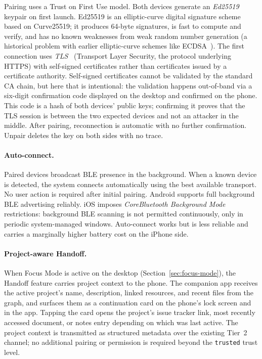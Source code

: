 Pairing uses a Trust on First Use model. Both devices generate an
\emph{Ed25519}~\cite{rfc8032} keypair on first launch. Ed25519 is an elliptic-curve digital signature scheme based on Curve25519;
it produces 64-byte signatures, is fast to compute and verify, and has no
known weaknesses from weak random number generation (a historical problem with
earlier elliptic-curve schemes like ECDSA~\cite{bitcoin:ecdsa}). The first connection uses \emph{TLS}~\cite{rfc8446} (Transport Layer
Security, the protocol underlying HTTPS) with self-signed certificates rather
than certificates issued by a certificate authority. Self-signed certificates
cannot be validated by the standard CA chain, but here that is intentional: the
validation happens out-of-band via a six-digit confirmation code displayed on
the desktop and confirmed on the phone. This code is a hash of both devices'
public keys; confirming it proves that the TLS session is between the two
expected devices and not an attacker in the middle. After pairing, reconnection is automatic with no
further confirmation. Unpair deletes the key on both sides with no trace.

\paragraph{Auto-connect.}
Paired devices broadcast BLE presence in the background. When a known device
is detected, the system connects automatically using the best available
transport. No user action is required after initial pairing. Android supports
full background BLE advertising reliably. iOS imposes
\emph{CoreBluetooth Background Mode}~\cite{apple:corebluetooth} restrictions:
background BLE scanning is not permitted continuously, only in periodic
system-managed windows. Auto-connect works but is less reliable and carries a
marginally higher battery cost on the iPhone side.

\paragraph{Project-aware Handoff.}
When Focus Mode is active on the desktop (Section~\ref{sec:focus-mode}), the
Handoff feature carries project context to the phone. The companion app
receives the active project's name, description, linked resources, and recent
files from the graph, and surfaces them as a continuation card on the phone's
lock screen and in the app. Tapping the card opens the project's issue tracker
link, most recently accessed document, or notes entry depending on which was
last active. The project context is transmitted as structured metadata over
the existing Tier~2 channel; no additional pairing or permission is required
beyond the \texttt{trusted} trust level.

